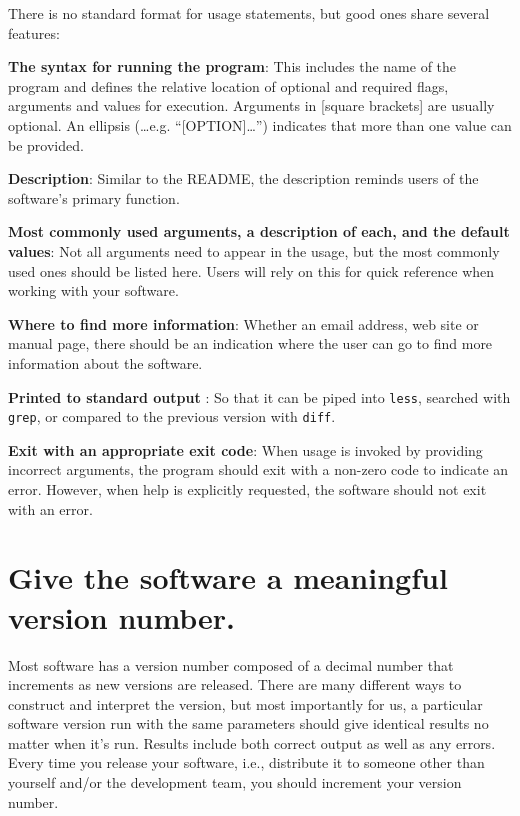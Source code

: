 \documentclass[10pt,letterpaper]{article}
\begin{document}
There is no standard format for usage statements, but good ones share
several features:

\textbf{The syntax for running the program}: This includes the name of the
program and defines the relative
location of optional and required flags, arguments and values for execution.
Arguments in {[}square brackets{]}
are usually optional. An ellipsis (\ldots e.g. ``{[}OPTION{]}\ldots{}'')
indicates that more than one value can be provided.

\textbf{Description}: Similar to the README, the
description reminds users of the software's primary function.

\textbf{Most commonly used arguments, a description of each, and the
default values}: Not all arguments need to appear in the usage, but the most
commonly used ones should be listed here. Users will rely on this for
quick reference when working with your software.

\textbf{Where to find more information}: Whether an email address, web
site or manual page, there should be an indication where the user can go
to find more information about the software.

\textbf{Printed to standard output} : So that it can be piped into
\texttt{less}, searched with \texttt{grep}, or compared to the previous
version with \texttt{diff}.

\textbf{Exit with an appropriate exit code}: When usage is invoked by
providing incorrect arguments, the program should exit with a non-zero
code to indicate an error. However, when help is explicitly requested,
the software should not exit with an error.

\section{Give the software a meaningful version number.}

Most software has a version number composed of a decimal number that
increments as new versions are released. There are many different ways
to construct and interpret the version, but most importantly for us, a
particular software version run with the same parameters should give
identical results no matter when it's run. Results include both correct
output as well as any errors.
Every time you release your software, i.e., distribute it to
someone other than yourself and/or the development team, you should
increment your version number.
\end{document}
